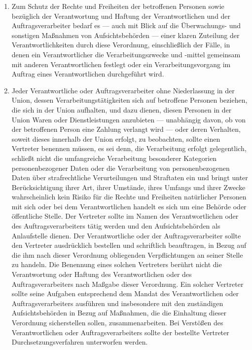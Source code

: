 \begin{enumerate}

   \item Zum Schutz der Rechte und Freiheiten der betroffenen Personen sowie bezüglich der Verantwortung und Haftung der
    Verantwortlichen und der Auftragsverarbeiter bedarf es — auch mit Blick auf die Überwachungs- und sonstigen
    Maßnahmen von Aufsichtsbehörden — einer klaren Zuteilung der Verantwortlichkeiten durch diese Verordnung,
    einschließlich der Fälle, in denen ein Verantwortlicher die Verarbeitungszwecke und -mittel gemeinsam mit anderen
    Verantwortlichen festlegt oder ein Verarbeitungsvorgang im Auftrag eines Verantwortlichen durchgeführt wird.%
   \label{itm:eg-79}
   

   \item Jeder Verantwortliche oder Auftragsverarbeiter ohne Niederlassung in der Union, dessen Verarbeitungstätigkeiten
    sich auf betroffene Personen beziehen, die sich in der Union aufhalten, und dazu dienen, diesen Personen in der
    Union Waren oder Dienstleistungen anzubieten — unabhängig davon, ob von der betroffenen Person eine Zahlung
    verlangt wird — oder deren Verhalten, soweit dieses innerhalb der Union erfolgt, zu beobachten, sollte einen
    Vertreter benennen müssen, es sei denn, die Verarbeitung erfolgt gelegentlich, schließt nicht die umfangreiche
    Verarbeitung besonderer Kategorien personenbezogener Daten oder die Verarbeitung von personenbezogenen Daten über
    strafrechtliche Verurteilungen und Straftaten ein und bringt unter Berücksichtigung ihrer Art, ihrer Umstände,
    ihres Umfangs und ihrer Zwecke wahrscheinlich kein Risiko für die Rechte und Freiheiten natürlicher Personen mit
    sich oder bei dem Verantwortlichen handelt es sich um eine Behörde oder öffentliche Stelle. Der Vertreter sollte im
    Namen des Verantwortlichen oder des Auftragsverarbeiters tätig werden und den Aufsichtsbehörden als Anlaufstelle
    dienen. Der Verantwortliche oder der Auftragsverarbeiter sollte den Vertreter ausdrücklich bestellen und
    schriftlich beauftragen, in Bezug auf die ihm nach dieser Verordnung obliegenden Verpflichtungen an seiner Stelle
    zu handeln. Die Benennung eines solchen Vertreters berührt nicht die Verantwortung oder Haftung des
    Verantwortlichen oder des Auftragsverarbeiters nach Maßgabe dieser Verordnung. Ein solcher Vertreter sollte seine
    Aufgaben entsprechend dem Mandat des Verantwortlichen oder Auftragsverarbeiters ausführen und insbesondere mit den
    zuständigen Aufsichtsbehörden in Bezug auf Maßnahmen, die die Einhaltung dieser Verordnung sicherstellen sollen,
    zusammenarbeiten. Bei Verstößen des Verantwortlichen oder Auftragsverarbeiters sollte der bestellte Vertreter
    Durchsetzungsverfahren unterworfen werden.%
   \label{itm:eg-80}
   

\end{enumerate}
